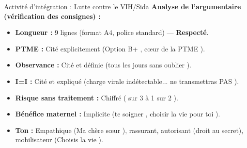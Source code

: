 \documentclass[11pt]{article}
\begin{document}
\begin{exoresolu}{Activité d'intégration : Lutte contre le VIH/Sida}
\textbf{Analyse de l'argumentaire (vérification des consignes) :}
\begin{itemize}
    \item \textbf{Longueur :} 9 lignes (format A4, police standard) — \textbf{Respecté}.
    \item \textbf{PTME :} Cité explicitement (\og Option B+ \fg, \og cœur de la PTME \fg).
    \item \textbf{Observance :} Cité et définie (\og tous les jours sans oublier \fg).
    \item \textbf{I=I :} Cité et expliqué (\og charge virale indétectable... ne transmettras PAS \fg).
    \item \textbf{Risque sans traitement :} Chiffré ( sur 3 à 1 sur 2 \fg).
    \item \textbf{Bénéfice maternel :} Implicite (\og te soigner \fg, \og choisir la vie pour toi \fg).
    \item \textbf{Ton :} Empathique (\og Ma chère sœur \fg), rassurant, autorisant (droit au secret), mobilisateur (\og Choisis la vie \fg).
\end{itemize}
\end{exoresolu}
\end{document}
